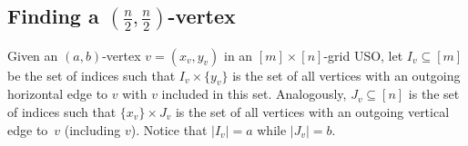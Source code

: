\documentclass[a4paper,10pt]{article}
\begin{document}
% 
% 

\subsection{Finding a $(\frac{n}{2}, \frac{n}{2})$-vertex}

Given an $(a, b)$-vertex $v = (x_v, y_v)$ in an $[m]\times [n]$-grid USO, let $I_v\subseteq [m]$ be the set of indices such that  $I_v \times \{y_v\}$ is the set of all vertices with an outgoing horizontal edge to $v$ with $v$ included in this set. Analogously, $J_v\subseteq [n]$ is the set of indices such that $\{x_v\}\times J_v$ is the set of all vertices with an outgoing vertical edge to~$v$ (including $v$). Notice that $|I_v| = a$ while $|J_v| = b$.
\end{document}
